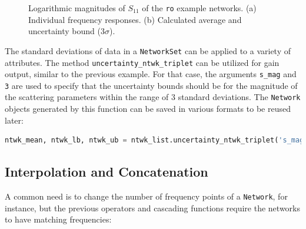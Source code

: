 \documentclass[10pt, letterpaper]{scrartcl}
\begin{document}
\begin{figure}
	\centering
	\caption{Logarithmic magnitudes of $S_{11}$ of the \texttt{ro} example networks. (a) Individual frequency responses. (b) Calculated average and uncertainty bound ($3 \sigma$).}
	\label{fig:networkset}
\end{figure}

The standard deviations of data in a \texttt{NetworkSet} can be applied to a variety of attributes. The method \texttt{uncertainty\_ntwk\_triplet} can be utilized for gain output, similar to the previous example. For that case, the arguments \texttt{s\_mag} and \texttt{3} are used to specify that the uncertainty bounds should be for the magnitude of the scattering parameters within the range of 3 standard deviations. The \texttt{Network} objects generated by this function can be saved in various formats to be reused later:

\begin{lstlisting}[language=Python]
ntwk_mean, ntwk_lb, ntwk_ub = ntwk_list.uncertainty_ntwk_triplet('s_mag', 3)
\end{lstlisting}

\subsection{Interpolation and Concatenation}
A common need is to change the number of frequency points of a \texttt{Network}, for instance, but the previous operators and cascading functions require the networks to have matching frequencies:
\end{document}
